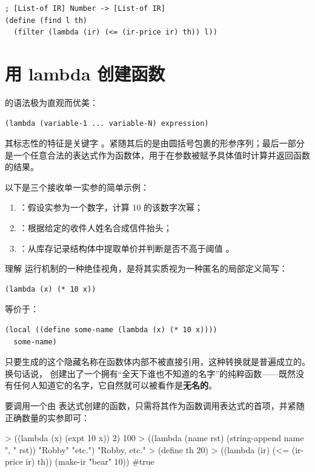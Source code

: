 \begin{lstlisting}[language=BSL]
; [List-of IR] Number -> [List-of IR]
(define (find l th)
  (filter (lambda (ir) (<= (ir-price ir) th)) l))
\end{lstlisting}

\section{用 lambda 创建函数}
\label{sec:17_1}

 的语法极为直观而优美：

\begin{lstlisting}[language=BSL]
(lambda (variable-1 ... variable-N) expression)
\end{lstlisting}

其标志性的特征是关键字 。紧随其后的是由圆括号包裹的形参序列；最后一部分是一个任意合法的表达式作为函数体，用于在参数被赋予具体值时计算并返回函数的结果。

以下是三个接收单一实参的简单示例：
\begin{enumerate}
  \item {}：假设实参为一个数字，计算 10 的该数字次幂；
  \item {}：根据给定的收件人姓名合成信件抬头；
  \item {}：从库存记录结构体中提取单价并判断是否不高于阈值 。
\end{enumerate}

理解  运行机制的一种绝佳视角，是将其实质视为一种匿名的局部定义简写：
\begin{lstlisting}[language=BSL]
(lambda (x) (* 10 x))
\end{lstlisting}
等价于：
\begin{lstlisting}[language=BSL]
(local ((define some-name (lambda (x) (* 10 x))))
  some-name)
\end{lstlisting}

只要生成的这个隐藏名称在函数体内部不被直接引用，这种转换就是普遍成立的。换句话说， 创建出了一个拥有“全天下谁也不知道的名字”的纯粹函数——既然没有任何人知道它的名字，它自然就可以被看作是\textbf{无名的}。

要调用一个由  表达式创建的函数，只需将其作为函数调用表达式的首项，并紧随正确数量的实参即可：

\begin{replbox}
> ((lambda (x) (expt 10 x)) 2)
100
> ((lambda (name rst) (string-append name ", " rst)) "Robby" "etc.")
"Robby, etc."
> (define th 20)
> ((lambda (ir) (<= (ir-price ir) th)) (make-ir "bear" 10))
#true
\end{replbox}

